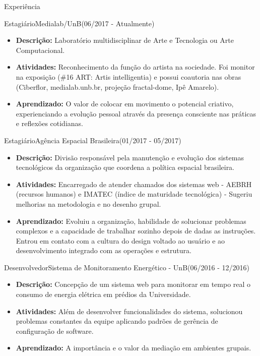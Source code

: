 \documentclass[]{fraguilarcv}
\begin{document}
	\makeheader

	\begin{cvsection}{Experiência}
    \begin{cvsubsection}{Estagiário}{Medialab/UnB}{(06/2017 - Atualmente)}
			\begin{itemize}
              \item \textbf{Descrição:} Laboratório multidisciplinar de Arte e Tecnologia ou Arte Computacional.
              \item \textbf{Atividades:} Reconhecimento da função do artista na sociedade. Foi monitor na exposição (\#16 ART: Artis intelligentia) e possui coautoria nas obras (Ciberflor, medialab.unb.br, projeção fractal-dome, Ipê Amarelo). 
              \item \textbf{Aprendizado:} O valor de colocar em movimento o potencial criativo, experienciando a evolução pessoal através da presença consciente nas práticas e reflexões cotidianas.
			\end{itemize}
		\end{cvsubsection}
		\begin{cvsubsection}{Estagiário}{Agência Espacial Brasileira}{(01/2017 - 05/2017)}
			\begin{itemize}
              \item \textbf{Descrição:} Divisão responsável pela manutenção e evolução dos sistemas tecnológicos da organização que coordena a política espacial brasileira.
              \item \textbf{Atividades:} Encarregado de atender chamados dos sistemas web - AEBRH (recursos humanos) e IMATEC (índice de maturidade tecnológica) - Sugeriu melhorias na metodologia e no desenho grupal.
              \item \textbf{Aprendizado:} Evoluiu a organização, habilidade de solucionar problemas complexos e a capacidade de trabalhar sozinho depois de dadas as instruções. Entrou em contato com a cultura do design voltado ao usuário e ao desenvolvimento integrado com as operações e estrutura.
			\end{itemize}
		\end{cvsubsection}

		\begin{cvsubsection}{Desenvolvedor}{Sistema de Monitoramento Energético - UnB}{(06/2016 - 12/2016)}
			\begin{itemize}
              \item \textbf{Descrição:} Concepção de um sistema web para monitorar em tempo real o consumo de energia elétrica em prédios da Universidade.             
              \item \textbf{Atividades:} Além de desenvolver funcionalidades do sistema, solucionou problemas constantes da equipe aplicando padrões de gerência de configuração de software.
              \item \textbf{Aprendizado:} A importância e o valor da mediação em ambientes grupais.
			\end{itemize}
		\end{cvsubsection}


\end{cvsection}
\end{document}
